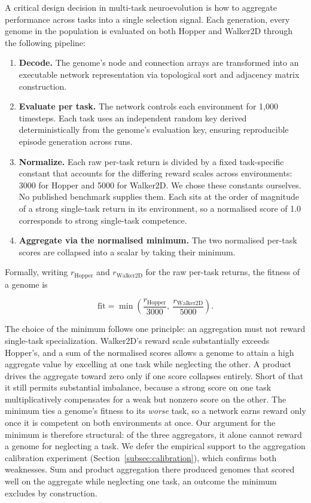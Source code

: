 \documentclass[12pt]{article}
\begin{document}
A critical design decision in multi-task neuroevolution is how to aggregate performance across tasks into a single selection signal.
Each generation, every genome in the population is evaluated on both Hopper and Walker2D through the following pipeline:

\begin{enumerate}
    \item \textbf{Decode.} The genome's node and connection arrays are transformed into an executable network representation via topological sort and adjacency matrix construction.
    \item \textbf{Evaluate per task.} The network controls each environment for 1,000 timesteps. Each task uses an independent random key derived deterministically from the genome's evaluation key, ensuring reproducible episode generation across runs.
    \item \textbf{Normalize.} Each raw per-task return is divided by a fixed task-specific constant that accounts for the differing reward scales across environments: 3000 for Hopper and 5000 for Walker2D. We chose these constants ourselves. No published benchmark supplies them. Each sits at the order of magnitude of a strong single-task return in its environment, so a normalised score of 1.0 corresponds to strong single-task competence.
    \item \textbf{Aggregate via the normalised minimum.} The two normalised per-task scores are collapsed into a scalar by taking their minimum.
\end{enumerate}

Formally, writing $r_{\text{Hopper}}$ and $r_{\text{Walker2D}}$ for the raw per-task returns, the fitness of a genome is

\[\text{fit} = \min\!\left(\frac{r_{\text{Hopper}}}{3000},\ \frac{r_{\text{Walker2D}}}{5000}\right).\]

The choice of the minimum follows one principle: an aggregation must not reward single-task specialization.
Walker2D's reward scale substantially exceeds Hopper's, and a sum of the normalised scores allows a genome to attain a high aggregate value by excelling at one task while neglecting the other.
A product drives the aggregate toward zero only if one score collapses entirely. Short of that it still permits substantial imbalance, because a strong score on one task multiplicatively compensates for a weak but nonzero score on the other.
The minimum ties a genome's fitness to its \emph{worse} task, so a network earns reward only once it is competent on both environments at once.
Our argument for the minimum is therefore structural: of the three aggregators, it alone cannot reward a genome for neglecting a task.
We defer the empirical support to the aggregation calibration experiment (Section~\ref{subsec:calibration}), which confirms both weaknesses. Sum and product aggregation there produced genomes that scored well on the aggregate while neglecting one task, an outcome the minimum excludes by construction.
\end{document}
